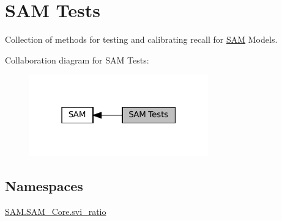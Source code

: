 \hypertarget{group__icubclient__SAM__Tests}{}\section{S\+AM Tests}
\label{group__icubclient__SAM__Tests}


Collection of methods for testing and calibrating recall for \hyperlink{namespaceSAM}{S\+AM} Models.  


Collaboration diagram for S\+AM Tests\+:
\nopagebreak
\begin{figure}[H]
\begin{center}
\leavevmode
\includegraphics[width=219pt]{group__icubclient__SAM__Tests}
\end{center}
\end{figure}
\subsection*{Namespaces}
\begin{DoxyCompactItemize}
\item 
 \hyperlink{namespaceSAM_1_1SAM__Core_1_1svi__ratio}{S\+A\+M.\+S\+A\+M\+\_\+\+Core.\+svi\+\_\+ratio}
\end{DoxyCompactItemize}
